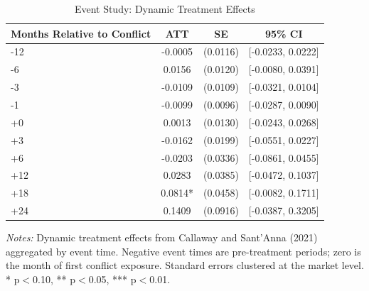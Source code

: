 \begin{table}[H]
\centering
\caption{Event Study: Dynamic Treatment Effects}
\label{tab:eventstudy}
\begin{threeparttable}
\begin{tabular}{lccc}
\toprule
Months Relative to Conflict & ATT & SE & 95\% CI \\
\midrule
-12 & -0.0005 & (0.0116) & [-0.0233, 0.0222] \\
-6 & 0.0156 & (0.0120) & [-0.0080, 0.0391] \\
-3 & -0.0109 & (0.0109) & [-0.0321, 0.0104] \\
-1 & -0.0099 & (0.0096) & [-0.0287, 0.0090] \\
+0 & 0.0013 & (0.0130) & [-0.0243, 0.0268] \\
+3 & -0.0162 & (0.0199) & [-0.0551, 0.0227] \\
+6 & -0.0203 & (0.0336) & [-0.0861, 0.0455] \\
+12 & 0.0283 & (0.0385) & [-0.0472, 0.1037] \\
+18 & 0.0814* & (0.0458) & [-0.0082, 0.1711] \\
+24 & 0.1409 & (0.0916) & [-0.0387, 0.3205] \\
\bottomrule
\end{tabular}
\begin{tablenotes}[flushleft]
\small
\item \textit{Notes:} Dynamic treatment effects from Callaway and Sant'Anna (2021) aggregated by event time. Negative event times are pre-treatment periods; zero is the month of first conflict exposure. Standard errors clustered at the market level. * p$<$0.10, ** p$<$0.05, *** p$<$0.01.
\end{tablenotes}
\end{threeparttable}
\end{table}
